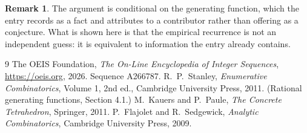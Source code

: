 \documentclass[11pt,a4paper]{article}
\theoremstyle{plain}
\theoremstyle{definition}
\newtheorem{remark}[theorem]{Remark}
\begin{document}
\begin{remark}
The argument is conditional on the generating function, which the entry records as a fact and
attributes to a contributor rather than offering as a conjecture. What is shown here is that
the empirical recurrence is not an independent guess: it is equivalent to information the
entry already contains.
\end{remark}

\begin{thebibliography}{9}
 The OEIS Foundation, \emph{The On-Line Encyclopedia of Integer
Sequences}, \url{https://oeis.org}, 2026. Sequence A266787.
 R.~P.~Stanley, \emph{Enumerative Combinatorics}, Volume 1, 2nd ed.,
Cambridge University Press, 2011. (Rational generating functions, Section 4.1.)
 M.~Kauers and P.~Paule, \emph{The Concrete Tetrahedron}, Springer, 2011.
 P.~Flajolet and R.~Sedgewick, \emph{Analytic Combinatorics}, Cambridge
University Press, 2009.
\end{thebibliography}
\end{document}
